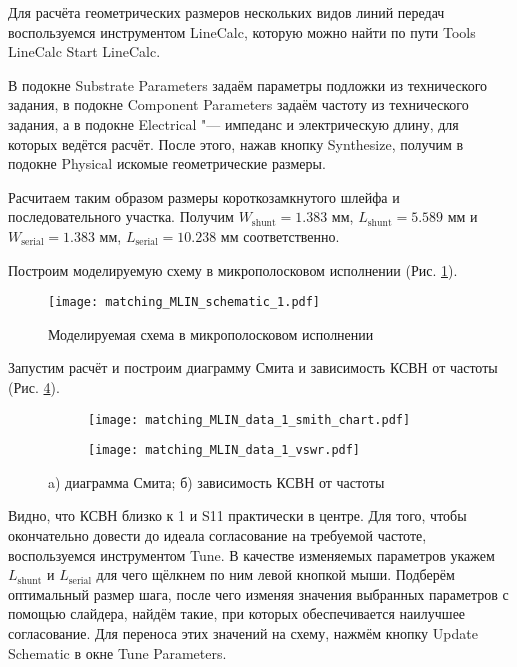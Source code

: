Для расчёта геометрических размеров нескольких видов линий передач воспользуемся инструментом LineCalc, которую можно найти по пути Tools \textrightarrow LineCalc \textrightarrow Start LineCalc.

В подокне Substrate Parameters задаём параметры подложки из технического задания, в подокне Component Parameters задаём частоту из технического задания, а в подокне Electrical "--- импеданс и электрическую длину, для которых ведётся расчёт.
После этого, нажав кнопку Synthesize, получим в подокне Physical искомые геометрические размеры.

Расчитаем таким образом размеры короткозамкнутого шлейфа и последовательного участка.
Получим $W_\text{shunt} = 1.383 \text{~мм}$, $L_\text{shunt} = 5.589 \text{~мм}$ и $W_\text{serial} = 1.383 \text{~мм}$, $L_\text{serial} = 10.238 \text{~мм}$ соответственно.

Построим моделируемую схему в микрополосковом исполнении (Рис. \ref{fig:matching_MLIN_schematic_1}).

\begin{figure}[!ht]
    \centering
    \texttt{[image: matching\_MLIN\_schematic\_1.pdf]}
    \caption{Моделируемая схема в микрополосковом исполнении}
    \label{fig:matching_MLIN_schematic_1}
\end{figure}

Запустим расчёт и построим диаграмму Смита и зависимость КСВН от частоты (Рис. \ref{fig:matching_MLIN_data_display_1}).

\begin{figure}[!ht]
    \begin{subfigure}[b]{0.45\textwidth}
        \centering
        \texttt{[image: matching\_MLIN\_data\_1\_smith\_chart.pdf]}
        \caption{}
        \label{fig:matching_MLIN_data_1_smith_chart}
    \end{subfigure}
    \hfill
    \begin{subfigure}[b]{0.45\textwidth}
        \centering
        \texttt{[image: matching\_MLIN\_data\_1\_vswr.pdf]}
        \caption{}
        \label{fig:matching_MLIN_data_1_vswr}
    \end{subfigure}
    \caption{
        a) диаграмма Смита;
        б) зависимость КСВН от частоты
    }
    \label{fig:matching_MLIN_data_display_1}
\end{figure}

Видно, что КСВН близко к 1 и S11 практически в центре.
Для того, чтобы окончательно довести до идеала согласование на требуемой частоте, воспользуемся инструментом Tune.
В качестве изменяемых параметров укажем $L_\text{shunt}$ и $L_\text{serial}$ для чего щёлкнем по ним левой кнопкой мыши.
Подберём оптимальный размер шага, после чего изменяя значения выбранных параметров с помощью слайдера, найдём такие, при которых обеспечивается наилучшее согласование.
Для переноса этих значений на схему, нажмём кнопку Update Schematic в окне Tune Parameters.

